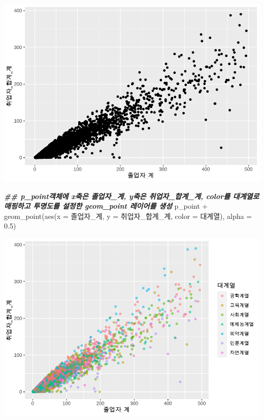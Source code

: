 \documentclass[
]{article}
\newenvironment{Shaded}{\begin{snugshade}}{\end{snugshade}}
\newcommand{\AttributeTok}[1]{\textcolor[rgb]{0.77,0.63,0.00}{#1}}
\newcommand{\DocumentationTok}[1]{\textcolor[rgb]{0.56,0.35,0.01}{\textbf{\textit{#1}}}}
\newcommand{\FloatTok}[1]{\textcolor[rgb]{0.00,0.00,0.81}{#1}}
\newcommand{\FunctionTok}[1]{\textcolor[rgb]{0.00,0.00,0.00}{#1}}
\newcommand{\NormalTok}[1]{#1}
\newcommand{\SpecialCharTok}[1]{\textcolor[rgb]{0.00,0.00,0.00}{#1}}
\begin{document}
\includegraphics{chap3_files/figure-latex/unnamed-chunk-28-1.pdf}

\begin{Shaded}
\begin{Highlighting}[]
\DocumentationTok{\#\#  p\_point객체에 x축은 졸업자\_계, y축은 취업자\_합계\_계, color를 대계열로 매핑하고 투명도를 설정한 geom\_point 레이어를 생성}
\NormalTok{p\_point }\SpecialCharTok{+}
  \FunctionTok{geom\_point}\NormalTok{(}\FunctionTok{aes}\NormalTok{(}\AttributeTok{x =}\NormalTok{ 졸업자\_계, }\AttributeTok{y =}\NormalTok{ 취업자\_합계\_계, }\AttributeTok{color =}\NormalTok{ 대계열), }\AttributeTok{alpha =} \FloatTok{0.5}\NormalTok{)}
\end{Highlighting}
\end{Shaded}

\includegraphics{chap3_files/figure-latex/unnamed-chunk-28-2.pdf}
\end{document}
